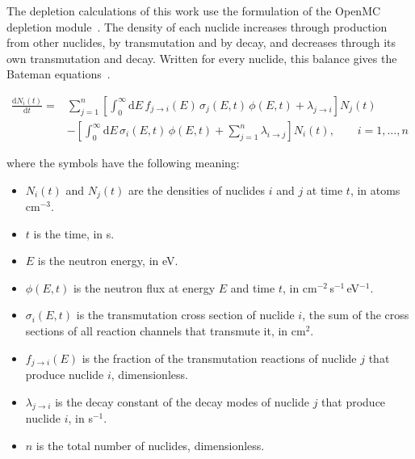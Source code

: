 The depletion calculations of this work use the formulation of the
OpenMC depletion module~\cite{romano_2021_depletion}. The density of
each nuclide increases through production from other nuclides, by
transmutation and by decay, and decreases through its own transmutation and
decay. Written for every nuclide, this balance gives the Bateman
equations~\cite{romano_2021_depletion}.

\begin{equation}
\begin{split}
\frac{\mathrm{d}N_i(t)}{\mathrm{d}t} = {} &
\sum_{j=1}^{n}\left[\int_0^\infty \mathrm{d}E\,
f_{j\rightarrow i}(E)\,\sigma_j(E,t)\,\phi(E,t)
+ \lambda_{j\rightarrow i}\right] N_j(t) \\
& - \left[\int_0^\infty \mathrm{d}E\,\sigma_i(E,t)\,\phi(E,t)
+ \sum_{j=1}^{n}\lambda_{i\rightarrow j}\right] N_i(t),
\qquad i = 1,\dots,n
\end{split}
\label{eq:bateman}
\end{equation}

\noindent where the symbols have the following meaning:

\begin{itemize}
  \item $N_i(t)$ and $N_j(t)$ are the densities of nuclides $i$ and $j$
        at time $t$, in atoms\,cm$^{-3}$.

  \item $t$ is the time, in s.

  \item $E$ is the neutron energy, in eV.

  \item $\phi(E,t)$ is the neutron flux at energy $E$ and time $t$, in
        cm$^{-2}$\,s$^{-1}$\,eV$^{-1}$.

  \item $\sigma_i(E,t)$ is the transmutation cross section of nuclide
        $i$, the sum of the cross sections of all reaction channels that
        transmute it, in cm$^{2}$.

  \item $f_{j\rightarrow i}(E)$ is the fraction of the transmutation
        reactions of nuclide $j$ that produce nuclide $i$,
        dimensionless.

  \item $\lambda_{j\rightarrow i}$ is the decay constant of the decay
        modes of nuclide $j$ that produce nuclide $i$, in s$^{-1}$.

  \item $n$ is the total number of nuclides, dimensionless.
\end{itemize}

